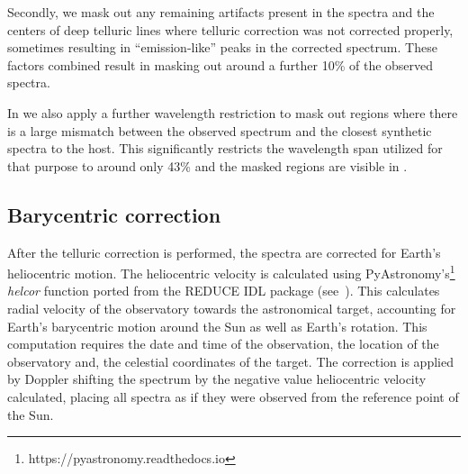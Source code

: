 Secondly, we mask out any remaining artifacts present in the spectra and the centers of deep telluric lines where telluric correction was not corrected properly, sometimes resulting in ``emission-like'' peaks in the corrected spectrum. These factors combined result in masking out around a further 10\% of the observed spectra. 

In  we also apply a further wavelength restriction to mask out regions where there is a large mismatch between the observed spectrum and the closest synthetic spectra to the host. This significantly restricts the wavelength span utilized for that purpose to around only 43\% and the masked regions are visible in . 




\subsection{Barycentric correction}
After the telluric correction is performed, the spectra are corrected for Earth's heliocentric motion. The heliocentric velocity is calculated using PyAstronomy's\footnote{https://pyastronomy.readthedocs.io} \emph{helcor} function ported from the REDUCE IDL package (see~\citet[][]{piskunov_new_2002}). This calculates radial velocity of the observatory towards the astronomical target, accounting for Earth's barycentric motion around the Sun as well as Earth's rotation. This computation requires the date and time of the observation, the location of the observatory and, the celestial coordinates of the target.
The correction is applied by Doppler shifting the spectrum by the negative value heliocentric velocity calculated, placing all spectra as if they were observed from the reference point of the Sun.
